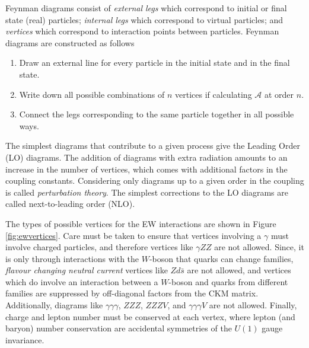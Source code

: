Feynman diagrams consist of \textit{external legs} which correspond to initial or final state (real) particles; \textit{internal legs} which correspond to virtual particles; and \textit{vertices} which correspond to interaction points between particles. Feynman diagrams are constructed as follows
\begin{enumerate}
    \item Draw an external line for every particle in the initial state and in the final state.
    \item Write down all possible combinations of $n$ vertices if calculating $\mathcal{A}$ at order $n$. 
    \item Connect the legs corresponding to the same particle together in all possible ways.
\end{enumerate}

The simplest diagrams that contribute to a given process give the Leading Order (LO) diagrams. The addition of diagrams with extra radiation amounts to an increase in the number of vertices, which comes with additional factors in the coupling constants. Considering only diagrams up to a given order in the coupling is called \textit{perturbation theory}. The simplest corrections to the LO diagrams are called next-to-leading order (NLO).

The types of possible vertices for the EW interactions are shown in Figure \ref{fig:ewvertices}. Care must be taken to ensure that vertices involving a $\gamma$ must involve charged particles, and therefore vertices like $\gamma ZZ$ are not allowed. Since, it is only through interactions with the $W$-boson that quarks can change families, \textit{flavour changing neutral current} vertices like $Z d\bar{s}$ are not allowed, and vertices which do involve an interaction between a $W$-boson and quarks from different families are suppressed by off-diagonal factors from the CKM matrix. Additionally, diagrams like $\gamma\gamma\gamma$, $ZZZ$, $ZZZV$, and $\gamma\gamma\gamma V$ are not allowed. Finally, charge and lepton number must be conserved at each vertex, where lepton (and baryon) number conservation are accidental symmetries of the $U(1)$ gauge invariance.

